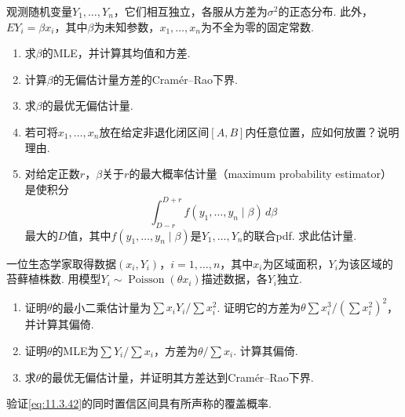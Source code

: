\begin{exercise}\label{exercise:11.37}
观测随机变量$Y_1,\ldots,Y_n$，它们相互独立，各服从方差为$\sigma^2$的正态分布. 此外，$EY_i=\beta x_i$，其中$\beta$为未知参数，$x_1,\ldots,x_n$为不全为零的固定常数.
\begin{enumerate}[label=(\alph*)]
\item\label{item:11.37.a} 求$\beta$的MLE，并计算其均值和方差.
\item\label{item:11.37.b} 计算$\beta$的无偏估计量方差的Cram\'er--Rao下界.
\item\label{item:11.37.c} 求$\beta$的最优无偏估计量.
\item\label{item:11.37.d} 若可将$x_1,\ldots,x_n$放在给定非退化闭区间$[A,B]$内任意位置，应如何放置？说明理由.
\item\label{item:11.37.e} 对给定正数$r$，$\beta$关于$r$的最大概率估计量（maximum probability estimator）是使积分
$$\int_{D-r}^{D+r}f(y_1,\ldots,y_n\mid\beta)\,d\beta$$
最大的$D$值，其中$f(y_1,\ldots,y_n\mid\beta)$是$Y_1,\ldots,Y_n$的联合pdf. 求此估计量.
\end{enumerate}
\end{exercise}

\begin{exercise}\label{exercise:11.38}
一位生态学家取得数据$(x_i,Y_i)$，$i=1,\ldots,n$，其中$x_i$为区域面积，$Y_i$为该区域的苔藓植株数. 用模型$Y_i\sim\operatorname{Poisson}(\theta x_i)$描述数据，各$Y_i$独立.
\begin{enumerate}[label=(\alph*)]
\item\label{item:11.38.a} 证明$\theta$的最小二乘估计量为$\sum x_iY_i/\sum x_i^2$. 证明它的方差为$\theta\sum x_i^3/(\sum x_i^2)^2$，并计算其偏倚.
\item\label{item:11.38.b} 证明$\theta$的MLE为$\sum Y_i/\sum x_i$，方差为$\theta/\sum x_i$. 计算其偏倚.
\item\label{item:11.38.c} 求$\theta$的最优无偏估计量，并证明其方差达到Cram\'er--Rao下界.
\end{enumerate}
\end{exercise}

\begin{exercise}\label{exercise:11.39}
验证\eqref{eq:11.3.42}的同时置信区间具有所声称的覆盖概率.
\end{exercise}

